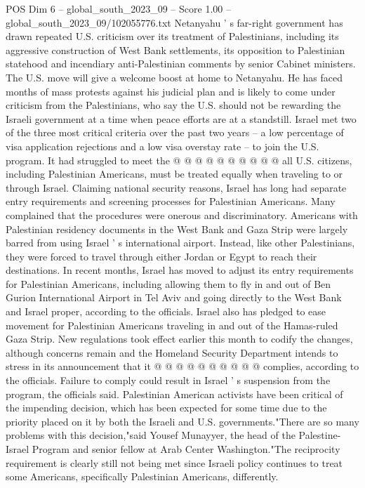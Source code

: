 \begin{textsample}{POS Dim 6 – global\_south\_2023\_09 – Score 1.00 – global\_south\_2023\_09/102055776.txt}
Netanyahu ' s far-right government has drawn repeated U.S. criticism over its treatment of Palestinians, including its aggressive construction of West Bank settlements, its opposition to Palestinian statehood and incendiary anti-Palestinian comments by senior Cabinet ministers.
The U.S. move will give a welcome boost at home to Netanyahu.
He has faced months of mass protests against his judicial plan and is likely to come under criticism from the Palestinians, who say the U.S. should not be rewarding the Israeli government at a time when peace efforts are at a standstill.
Israel met two of the three most critical criteria over the past two years -- a low percentage of visa application rejections and a low visa overstay rate -- to join the U.S. program.
It had struggled to meet the @ @ @ @ @ @ @ @ @ @ all U.S. citizens, including Palestinian Americans, must be treated equally when traveling to or through Israel.
Claiming national security reasons, Israel has long had separate entry requirements and screening processes for Palestinian Americans.
Many complained that the procedures were onerous and discriminatory.
Americans with Palestinian residency documents in the West Bank and Gaza Strip were largely barred from using Israel ' s international airport.
Instead, like other Palestinians, they were forced to travel through either Jordan or Egypt to reach their destinations.
In recent months, Israel has moved to adjust its entry requirements for Palestinian Americans, including allowing them to fly in and out of Ben Gurion International Airport in Tel Aviv and going directly to the West Bank and Israel proper, according to the officials.
Israel also has pledged to ease movement for Palestinian Americans traveling in and out of the Hamas-ruled Gaza Strip.
New regulations took effect earlier this month to codify the changes, although concerns remain and the Homeland Security Department intends to stress in its announcement that it @ @ @ @ @ @ @ @ @ @ complies, according to the officials.
Failure to comply could result in Israel ' s suspension from the program, the officials said.
Palestinian American activists have been critical of the impending decision, which has been expected for some time due to the priority placed on it by both the Israeli and U.S. governments."There are so many problems with this decision,"said Yousef Munayyer, the head of the Palestine-Israel Program and senior fellow at Arab Center Washington."The reciprocity requirement is clearly still not being met since Israeli policy continues to treat some Americans, specifically Palestinian Americans, differently.

\end{textsample}
